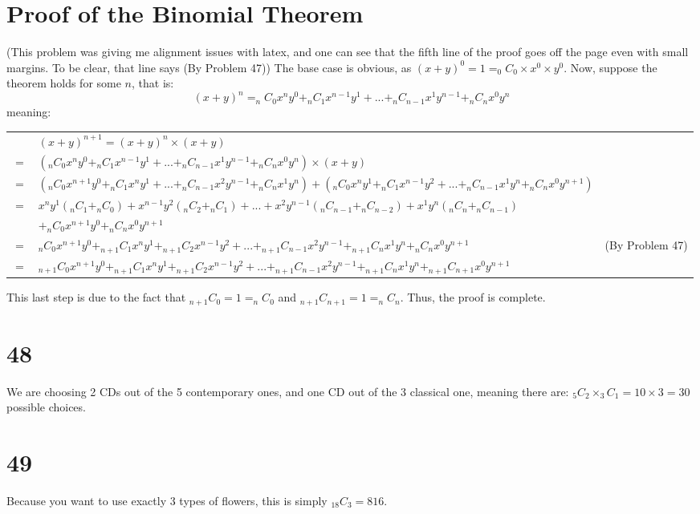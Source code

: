 \documentclass{article}
\theoremstyle{definition}
\newcommand{\?}{\stackrel{?}{=}}
\begin{document}
\section*{Proof of the Binomial Theorem}
(This problem was giving me alignment issues with latex, and one can see that the fifth line of the proof goes off the page even with small margins. To be clear, that line says (By Problem 47))\newline
The base case is obvious, as $\left(x+y\right)^0=1=_0C_0\times x^0\times y^0$. Now, suppose the theorem holds for some $n$, that is:
\[ \left(x+y\right)^n=_nC_0x^ny^0+_nC_1x^{n-1}y^1+...+_nC_{n-1}x^1y^{n-1}+_nC_nx^0y^n \] meaning:
\begin{center}
\begin{tabular}{lll}
    & $\left(x+y\right)^{n+1}=\left(x+y\right)^n\times\left(x+y\right)$ \\
$=$ & $\left(_nC_0x^ny^0+_nC_1x^{n-1}y^1+...+_nC_{n-1}x^1y^{n-1}+_nC_nx^0y^n\right)\times\left(x+y\right)$ \\
$=$ & $\left(_nC_0x^{n+1}y^0+_nC_1x^ny^1+...+_nC_{n-1}x^2y^{n-1}+_nC_nx^1y^n\right)+\left(_nC_0x^ny^1+_nC_1x^{n-1}y^2+...+_nC_{n-1}x^1y^n+_nC_nx^0y^{n+1}\right)$ \\
$=$ & $x^ny^1\left(_nC_1+_nC_0\right)+x^{n-1}y^2\left(_nC_2+_nC_1\right)+...+x^2y^{n-1}\left(_nC_{n-1}+_nC_{n-2}\right)+x^1y^n\left(_nC_n+_nC_{n-1}\right)$ \\
    & $+_nC_0x^{n+1}y^0+_nC_nx^0y^{n+1}$ \\
$=$ & $_nC_0x^{n+1}y^0+_{n+1}C_1x^ny^1+_{n+1}C_2x^{n-1}y^2+...+_{n+1}C_{n-1}x^2y^{n-1}+_{n+1}C_nx^1y^n+_nC_nx^0y^{n+1}$ & (By Problem 47) \\
$=$ & $_{n+1}C_0x^{n+1}y^0+_{n+1}C_1x^ny^1+_{n+1}C_2x^{n-1}y^2+...+_{n+1}C_{n-1}x^2y^{n-1}+_{n+1}C_nx^1y^n+_{n+1}C_{n+1}x^0y^{n+1}$
\end{tabular}
\end{center}
This last step is due to the fact that $_{n+1}C_0=1=_nC_0$ and $_{n+1}C_{n+1}=1=_nC_n$. Thus, the proof is complete.

\section*{48}
We are choosing 2 CDs out of the 5 contemporary ones, and one CD out of the 3 classical one, meaning there are:
$_5C_2\times _3C_1=10\times 3=30$ possible choices.

\section*{49}
Because you want to use exactly 3 types of flowers, this is simply $_{18}C_3=816$.
\end{document}
